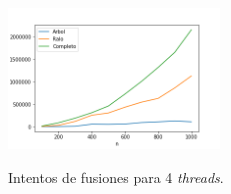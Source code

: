 \begin{figure}[h]
   \centering
   \caption{Intentos de fusiones para 4 \textit{threads}.}
   \includegraphics[width=0.5\textwidth]{imagenes/intentos-fusiones-4-threads.png}
   \label{fig:intentos4threads}
\end{figure}

